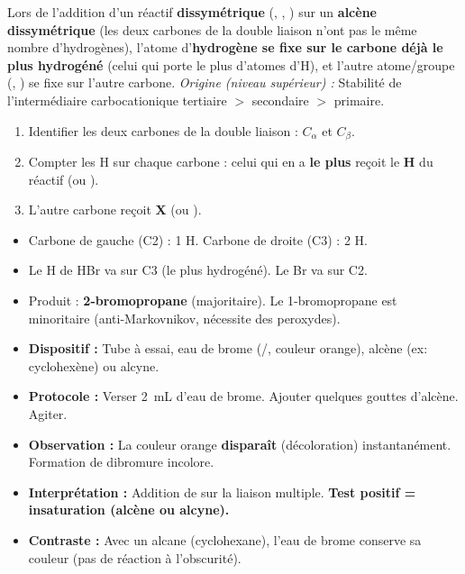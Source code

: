\documentclass[11pt]{article}
\begin{document}
\begin{definition}
Lors de l'addition d'un réactif \textbf{dissymétrique} (, , ) sur un \textbf{alcène dissymétrique} (les deux carbones de la double liaison n'ont pas le même nombre d'hydrogènes), l'atome d'\textbf{hydrogène se fixe sur le carbone déjà le plus hydrogéné} (celui qui porte le plus d'atomes d'H), et l'autre atome/groupe (, ) se fixe sur l'autre carbone.
\emph{Origine (niveau supérieur) :} Stabilité de l'intermédiaire carbocationique tertiaire $>$ secondaire $>$ primaire.
\end{definition}

\begin{methode}
\begin{enumerate}
  \item Identifier les deux carbones de la double liaison : $C_\alpha$ et $C_\beta$.
  \item Compter les H sur chaque carbone : celui qui en a \textbf{le plus} reçoit le \textbf{H} du réactif  (ou ).
  \item L'autre carbone reçoit \textbf{X} (ou ).
\end{enumerate}
\end{methode}

\begin{exemplebox}
\begin{itemize}
  \item Carbone de gauche (C2) : 1 H. Carbone de droite (C3) : 2 H.
  \item Le H de HBr va sur C3 (le plus hydrogéné). Le Br va sur C2.
  \item Produit : \textbf{2-bromopropane} (majoritaire). Le 1-bromopropane est minoritaire (anti-Markovnikov, nécessite des peroxydes).
\end{itemize}
\end{exemplebox}

\begin{experience}
\begin{itemize}
  \item \textbf{Dispositif :} Tube à essai, eau de brome (/, couleur orange), alcène (ex: cyclohexène) ou alcyne.
  \item \textbf{Protocole :} Verser \SI{2}{mL} d'eau de brome. Ajouter quelques gouttes d'alcène. Agiter.
  \item \textbf{Observation :} La couleur orange \textbf{disparaît} (décoloration) instantanément. Formation de dibromure incolore.
  \item \textbf{Interprétation :} Addition de  sur la liaison multiple. \textbf{Test positif = insaturation (alcène ou alcyne).}
  \item \textbf{Contraste :} Avec un alcane (cyclohexane), l'eau de brome conserve sa couleur (pas de réaction à l'obscurité).
\end{itemize}
\end{experience}
\end{document}
